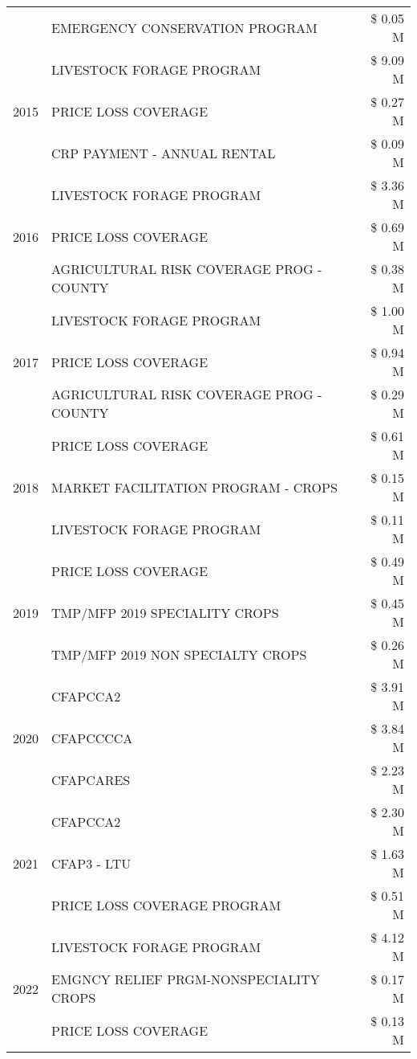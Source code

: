 \begin{tabular}{llr}
 & EMERGENCY CONSERVATION PROGRAM & \$ 0.05 M \\
\cline{1-3}
\multirow[t]{3}{*}{2015} & LIVESTOCK FORAGE PROGRAM & \$ 9.09 M \\
 & PRICE LOSS COVERAGE & \$ 0.27 M \\
 & CRP PAYMENT - ANNUAL RENTAL & \$ 0.09 M \\
\cline{1-3}
\multirow[t]{3}{*}{2016} & LIVESTOCK FORAGE PROGRAM & \$ 3.36 M \\
 & PRICE LOSS COVERAGE & \$ 0.69 M \\
 & AGRICULTURAL RISK COVERAGE PROG - COUNTY & \$ 0.38 M \\
\cline{1-3}
\multirow[t]{3}{*}{2017} & LIVESTOCK FORAGE PROGRAM & \$ 1.00 M \\
 & PRICE LOSS COVERAGE & \$ 0.94 M \\
 & AGRICULTURAL RISK COVERAGE PROG - COUNTY & \$ 0.29 M \\
\cline{1-3}
\multirow[t]{3}{*}{2018} & PRICE LOSS COVERAGE & \$ 0.61 M \\
 & MARKET FACILITATION PROGRAM - CROPS & \$ 0.15 M \\
 & LIVESTOCK FORAGE PROGRAM & \$ 0.11 M \\
\cline{1-3}
\multirow[t]{3}{*}{2019} & PRICE LOSS COVERAGE & \$ 0.49 M \\
 & TMP/MFP 2019 SPECIALITY CROPS & \$ 0.45 M \\
 & TMP/MFP 2019 NON SPECIALTY CROPS & \$ 0.26 M \\
\cline{1-3}
\multirow[t]{3}{*}{2020} & CFAPCCA2 & \$ 3.91 M \\
 & CFAPCCCCA & \$ 3.84 M \\
 & CFAPCARES & \$ 2.23 M \\
\cline{1-3}
\multirow[t]{3}{*}{2021} & CFAPCCA2 & \$ 2.30 M \\
 & CFAP3 - LTU & \$ 1.63 M \\
 & PRICE LOSS COVERAGE PROGRAM & \$ 0.51 M \\
\cline{1-3}
\multirow[t]{3}{*}{2022} & LIVESTOCK FORAGE PROGRAM & \$ 4.12 M \\
 & EMGNCY RELIEF PRGM-NONSPECIALITY CROPS & \$ 0.17 M \\
 & PRICE LOSS COVERAGE & \$ 0.13 M \\
\cline{1-3}
\bottomrule
\end{tabular}
